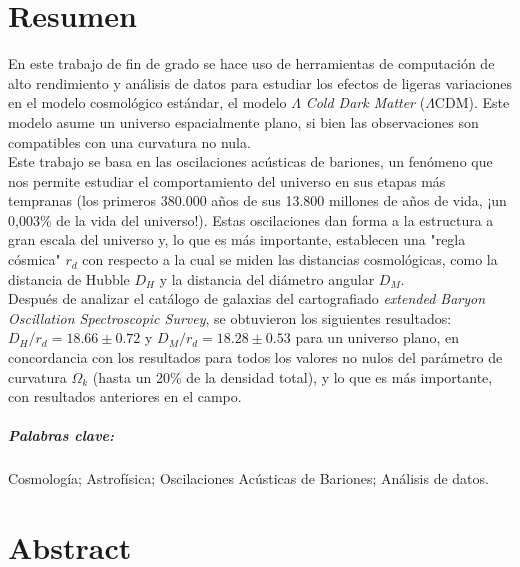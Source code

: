 \chapter*{Resumen}

En este trabajo de fin de grado se hace uso de herramientas de computación de alto rendimiento y análisis de datos para estudiar los efectos de ligeras variaciones en el modelo cosmológico estándar, el modelo $\Lambda$ \textit{Cold Dark Matter} ($\Lambda$CDM). Este modelo asume un universo espacialmente plano, si bien las observaciones son compatibles con una curvatura no nula.\\

Este trabajo se basa en las oscilaciones acústicas de bariones, un fenómeno que nos permite estudiar el comportamiento del universo en sus etapas más tempranas (los primeros 380.000 años de sus 13.800 millones de años de vida, ¡un 0,003\% de la vida del universo!). Estas oscilaciones dan forma a la estructura a gran escala del universo y, lo que es más importante, establecen una "regla cósmica" $r_d$ con respecto a la cual se miden las distancias cosmológicas, como la distancia de Hubble $D_H$ y la distancia del diámetro angular $D_M$. \\

Después de analizar el catálogo de galaxias del cartografiado \textit{extended Baryon Oscillation Spectroscopic Survey}, se obtuvieron los siguientes resultados: $D_H/r_d = 18.66\pm 0.72$ y $D_M/r_d = 18.28\pm 0.53$ para un universo plano, en concordancia con los resultados para todos los valores no nulos del parámetro de curvatura $\Omega_k$ (hasta un 20\% de la densidad total), y lo que es más importante, con resultados anteriores en el campo.

\paragraph{Palabras clave:} Cosmología; Astrofísica; Oscilaciones Acústicas de Bariones; Análisis de datos.









\chapter*{Abstract}

